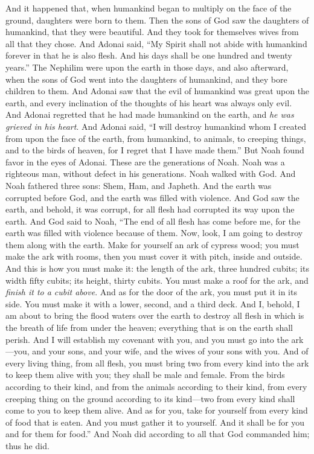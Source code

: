 \begin{biblechapter} %
 And it happened that, when humankind began to multiply on the face of the ground, daughters were born to them.
\verse Then the sons of God saw the daughters of humankind, that they were beautiful. And they took for themselves wives from all that they chose.
\verse And Adonai said, “My Spirit shall not abide with humankind forever in that he is also flesh. And his days shall be one hundred and twenty years.”
\verse The Nephilim were upon the earth in those days, and also afterward, when the sons of God went into the daughters of humankind, and they bore children to them.
\verse And Adonai saw that the evil of humankind was great upon the earth, and every inclination of the thoughts of his heart was always only evil.
\verse And Adonai regretted that he had made humankind on the earth, and \textit{he was grieved in his heart}.
\verse And Adonai said, “I will destroy humankind whom I created from upon the face of the earth, from humankind, to animals, to creeping things, and to the birds of heaven, for I regret that I have made them.”
\verse But Noah found favor in the eyes of Adonai.
\verse These are the generations of Noah. Noah was a righteous man, without defect in his generations. Noah walked with God.
\verse And Noah fathered three sons: Shem, Ham, and Japheth.
\verse And the earth was corrupted before God, and the earth was filled with violence.
\verse And God saw the earth, and behold, it was corrupt, for all flesh had corrupted its way upon the earth.
\verse And God said to Noah, “The end of all flesh has come before me, for the earth was filled with violence because of them. Now, look, I am going to destroy them along with the earth.
\verse Make for yourself an ark of cypress wood; you must make the ark with rooms, then you must cover it with pitch, inside and outside.
\verse And this is how you must make it: the length of the ark, three hundred cubits; its width fifty cubits; its height, thirty cubits.
\verse You must make a roof for the ark, and \textit{finish it to a cubit above}. And as for the door of the ark, you must put it in its side. You must make it with a lower, second, and a third deck.
\verse And I, behold, I am about to bring the flood waters over the earth to destroy all flesh in which is the breath of life from under the heaven; everything that is on the earth shall perish.
\verse And I will establish my covenant with you, and you must go into the ark—you, and your sons, and your wife, and the wives of your sons with you.
\verse And of every living thing, from all flesh, you must bring two from every kind into the ark to keep them alive with you; they shall be male and female.
\verse From the birds according to their kind, and from the animals according to their kind, from every creeping thing on the ground according to its kind—two from every kind shall come to you to keep them alive.
\verse And as for you, take for yourself from every kind of food that is eaten. And you must gather it to yourself. And it shall be for you and for them for food.”
\verse And Noah did according to all that God commanded him; thus he did.
\end{biblechapter}


